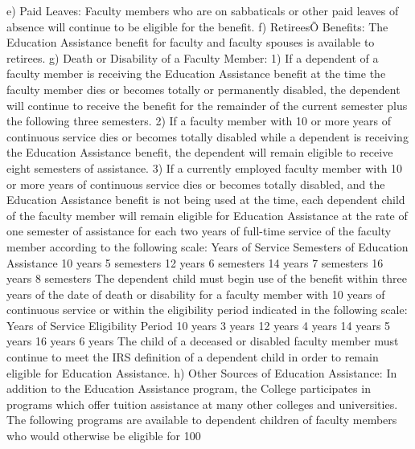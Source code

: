 \documentclass[letterpaper, 11pt]{article}
\begin{document}
				e) Paid Leaves:
				Faculty members who are on sabbaticals or other paid leaves of absence will continue to be eligible for the benefit.
				f) RetireesÕ Benefits:
				The Education Assistance benefit for faculty and faculty spouses is available to retirees.
				g) Death or Disability of a Faculty Member:
				1) If a dependent of a faculty member is receiving the Education Assistance benefit at the time the faculty member dies or becomes totally or permanently disabled, the dependent will continue to receive the benefit for the remainder of the current semester plus the following three semesters.
				2) If a faculty member with 10 or more years of continuous service dies or becomes totally disabled while a dependent is receiving the Education Assistance benefit, the dependent will remain eligible to receive eight semesters of assistance.
				3) If a currently employed faculty member with 10 or more years of continuous service dies or becomes totally disabled, and the Education Assistance benefit is not being used at the time, each dependent child of the faculty member will remain eligible for Education Assistance at the rate of one semester of assistance for each two years of full-time service of the faculty member according to the following scale:
				Years of Service			Semesters of Education Assistance
				10 years				5 semesters
				12 years				6 semesters
				14 years				7 semesters
				16 years				8 semesters
				The dependent child must begin use of the benefit within three years of the date of death or disability for a faculty member with 10 years of continuous service or within the eligibility period indicated in the following scale:
				Years of Service			Eligibility Period
				10 years				3 years
				12 years				4 years
				14 years				5 years
				16 years				6 years
				The child of a deceased or disabled faculty member must continue to meet the IRS definition of a dependent child in order to remain eligible for Education Assistance.
				h) Other Sources of Education Assistance:
				In addition to the Education Assistance program, the College participates in programs which offer tuition assistance at many other colleges and universities.  The following programs are available to dependent children of faculty members who would otherwise be eligible for 100%
\end{document}
